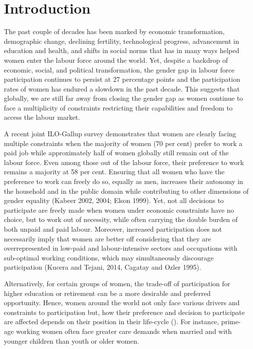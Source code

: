 \section{Introduction}
The past couple of decades has been marked by economic transformation, demographic change, declining fertility, technological progress, advancement in education and health, and shifts in social norms that has in many ways helped women enter the labour force around the world.  Yet, despite a backdrop of economic, social, and political transformation, the gender gap in labour force participation continues to persist at 27 percentage points and the participation rates of women has endured a slowdown in the past decade. This suggests that globally, we are still far away from closing the gender gap as women continue to face a multiplicity of constraints restricting their capabilities and freedom to access the labour market.  

A recent joint ILO-Gallup survey demonstrates that women are clearly facing multiple constraints when the majority of women (70 per cent) prefer to work a paid job while approximately half of women globally still remain out of the labour force. Even among those out of the labour force, their preference to work remains a majority at 58 per cent. Ensuring that all women who have the preference to work can freely do so, equally as men, increases their autonomy in the household and in the public domain while contributing to other dimensions of gender equality (Kabeer 2002, 2004; Elson 1999). Yet, not all decisions to participate are freely made when women under economic constraints have no choice, but to work out of necessity, while often carrying the double burden of both unpaid and paid labour. Moreover, increased participation does not necessarily imply that women are better off considering that they are overrepresented in low-paid and labour-intensive sectors and occupations with sub-optimal working conditions, which may simultaneously discourage participation (Kucera and Tejani, 2014, Cagatay and Ozler 1995). 

Alternatively, for certain groups of women, the trade-off of participation for higher education or retirement can be a more desirable and preferred opportunity. Hence, women around the world not only face various drivers and constraints to participation but, how their preference and decision to participate are affected depends on their position in their life-cycle (\cite{besamusca2015working}). For instance, prime-age working women often face greater care demands when married and with younger children than youth or older women.

